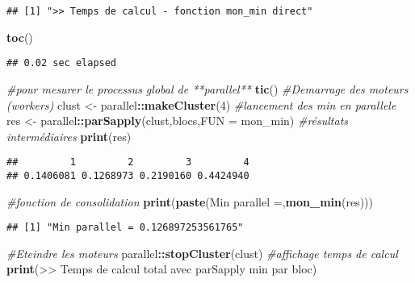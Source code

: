 \documentclass[
]{article}
\newenvironment{Shaded}{\begin{snugshade}}{\end{snugshade}}
\newcommand{\AttributeTok}[1]{\textcolor[rgb]{0.13,0.29,0.53}{#1}}
\newcommand{\CommentTok}[1]{\textcolor[rgb]{0.56,0.35,0.01}{\textit{#1}}}
\newcommand{\DecValTok}[1]{\textcolor[rgb]{0.00,0.00,0.81}{#1}}
\newcommand{\FunctionTok}[1]{\textcolor[rgb]{0.13,0.29,0.53}{\textbf{#1}}}
\newcommand{\NormalTok}[1]{#1}
\newcommand{\OtherTok}[1]{\textcolor[rgb]{0.56,0.35,0.01}{#1}}
\newcommand{\SpecialCharTok}[1]{\textcolor[rgb]{0.81,0.36,0.00}{\textbf{#1}}}
\newcommand{\StringTok}[1]{\textcolor[rgb]{0.31,0.60,0.02}{#1}}
\begin{document}
\begin{verbatim}
## [1] ">> Temps de calcul - fonction mon_min direct"
\end{verbatim}

\begin{Shaded}
\begin{Highlighting}[]
\FunctionTok{toc}\NormalTok{()}
\end{Highlighting}
\end{Shaded}

\begin{verbatim}
## 0.02 sec elapsed
\end{verbatim}

\begin{Shaded}
\begin{Highlighting}[]
\CommentTok{\#pour mesurer le processus global de **parallel**}
\FunctionTok{tic}\NormalTok{()}
\CommentTok{\#Demarrage des moteurs (workers)}
\NormalTok{clust }\OtherTok{\textless{}{-}}\NormalTok{ parallel}\SpecialCharTok{::}\FunctionTok{makeCluster}\NormalTok{(}\DecValTok{4}\NormalTok{)}
\CommentTok{\#lancement des min en parallele}
\NormalTok{res }\OtherTok{\textless{}{-}}\NormalTok{ parallel}\SpecialCharTok{::}\FunctionTok{parSapply}\NormalTok{(clust,blocs,}\AttributeTok{FUN =}\NormalTok{ mon\_min)}
\CommentTok{\#résultats intermédiaires}
\FunctionTok{print}\NormalTok{(res)}
\end{Highlighting}
\end{Shaded}

\begin{verbatim}
##         1         2         3         4 
## 0.1406081 0.1268973 0.2190160 0.4424940
\end{verbatim}

\begin{Shaded}
\begin{Highlighting}[]
\CommentTok{\#fonction de consolidation}
\FunctionTok{print}\NormalTok{(}\FunctionTok{paste}\NormalTok{(}\StringTok{\textquotesingle{}Min parallel =\textquotesingle{}}\NormalTok{,}\FunctionTok{mon\_min}\NormalTok{(res)))}
\end{Highlighting}
\end{Shaded}

\begin{verbatim}
## [1] "Min parallel = 0.126897253561765"
\end{verbatim}

\begin{Shaded}
\begin{Highlighting}[]
\CommentTok{\#Eteindre les moteurs}
\NormalTok{parallel}\SpecialCharTok{::}\FunctionTok{stopCluster}\NormalTok{(clust)}
\CommentTok{\#affichage temps de calcul}
\FunctionTok{print}\NormalTok{(}\StringTok{\textquotesingle{}\textgreater{}\textgreater{} Temps de calcul total avec parSapply min par bloc\textquotesingle{}}\NormalTok{)}
\end{Highlighting}
\end{Shaded}
\end{document}
